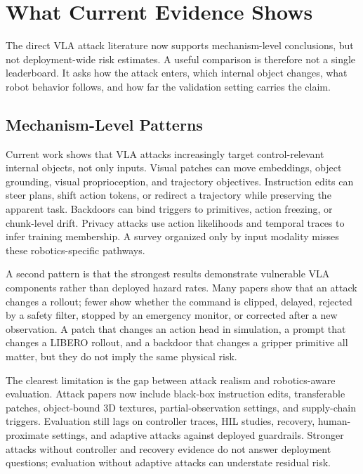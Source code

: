\section{What Current Evidence Shows}
\label{sec:cross-study}

The direct VLA attack literature now supports mechanism-level conclusions, but not deployment-wide risk estimates. A useful comparison is therefore not a single leaderboard. It asks how the attack enters, which internal object changes, what robot behavior follows, and how far the validation setting carries the claim.



\subsection{Mechanism-Level Patterns}

Current work shows that VLA attacks increasingly target control-relevant internal objects, not only inputs. Visual patches can move embeddings, object grounding, visual proprioception, and trajectory objectives. Instruction edits can steer plans, shift action tokens, or redirect a trajectory while preserving the apparent task. Backdoors can bind triggers to primitives, action freezing, or chunk-level drift. Privacy attacks use action likelihoods and temporal traces to infer training membership. A survey organized only by input modality misses these robotics-specific pathways.

A second pattern is that the strongest results demonstrate vulnerable VLA components rather than deployed hazard rates. Many papers show that an attack changes a rollout; fewer show whether the command is clipped, delayed, rejected by a safety filter, stopped by an emergency monitor, or corrected after a new observation. A patch that changes an action head in simulation, a prompt that changes a LIBERO rollout, and a backdoor that changes a gripper primitive all matter, but they do not imply the same physical risk.

The clearest limitation is the gap between attack realism and robotics-aware evaluation. Attack papers now include black-box instruction edits, transferable patches, object-bound 3D textures, partial-observation settings, and supply-chain triggers. Evaluation still lags on controller traces, HIL studies, recovery, human-proximate settings, and adaptive attacks against deployed guardrails. Stronger attacks without controller and recovery evidence do not answer deployment questions; evaluation without adaptive attacks can understate residual risk.

